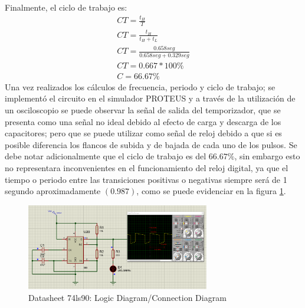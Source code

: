 Finalmente, el ciclo de trabajo es:
\[\begin{array}{crl}
    CT=\frac{t_{H}}{T}
    \\
    CT=\frac{t_{H}}{t_{H}+t_{L}}
    \\
    CT=\frac{0.658seg}{0.658seg+0.329seg}
    \\
    CT=0.667*100\%
    \\
    C=66.67\%
\end{array}
\]
Una vez realizados los cálculos de frecuencia, periodo y ciclo de trabajo; se implementó el circuito en el simulador PROTEUS y a través de la utilización de un osciloscopio se puede observar la señal de salida del  temporizador, que se presenta como una señal no ideal debido al efecto de carga y descarga de los capacitores; pero que se puede utilizar como señal de reloj debido a que si es posible diferencia los flancos de subida y de bajada de cada uno de los pulsos.
Se debe notar adicionalmente que el ciclo de trabajo es del $66.67\%$, sin embargo esto no representara  inconvenientes  en  el  funcionamiento  del  reloj  digital,  ya  que  el  tiempo  o periodo  entre  las  transiciones  positivas  o  negativas  siempre  será  de  1  segundo aproximadamente $\left ( 0.987 \right )$, como se puede evidenciar en la figura \ref{osiloscop_sim}.
\newline
\begin{figure}[h]
    \begin{center}
    \includegraphics[width=8cm]{images/image3.png}
    \newline
    \caption{Datasheet 74ls90: Logic Diagram/Connection Diagram}\label{osiloscop_sim}
    \end{center}
\end{figure}
\newline
